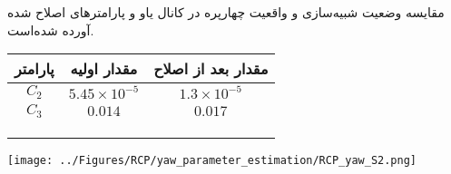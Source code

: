 
مقایسه وضعیت شبیه‌سازی و واقعیت چهارپره در کانال یاو و پارامترهای اصلاح شده آورده شده‌است.



\begin{minipage}[H]{\linewidth}
	\hfill
	\begin{minipage}[b]{0.49\linewidth}
		\centering
		\begin{tabular}{ccc}\hline
			پارامتر & مقدار اولیه  & مقدار بعد از اصلاح
			\\ \hline
			$C_2$  & $5.45\times10^{-5}$ & $1.3\times10^{-5}$ \\
			$C_3$  & $0.014$ & $0.017$ \\ \hline
			\\\\\\
		\end{tabular}
	\captionsetup{justification=centering}
	\end{minipage}
	\begin{minipage}[b]{0.48\linewidth}
		\centering
		\texttt{[image: ../Figures/RCP/yaw\_parameter\_estimation/RCP\_yaw\_S2.png]}
		\captionsetup{justification=centering}
	\end{minipage}
\end{minipage}

